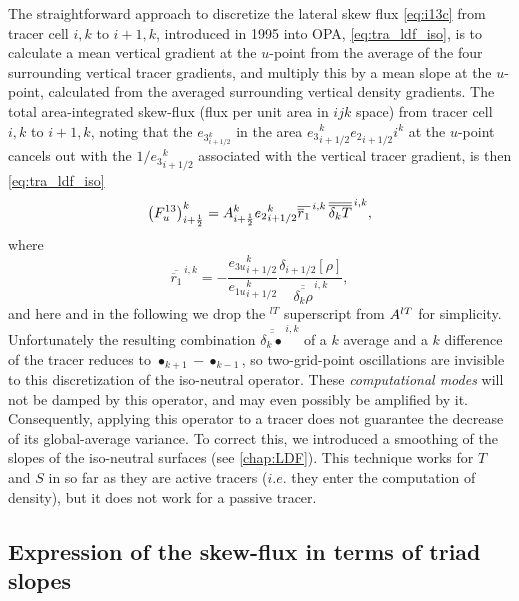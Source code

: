 \documentclass[../main/NEMO_manual]{subfiles}
\begin{document}
The straightforward approach to discretize the lateral skew flux
\autoref{eq:i13c} from tracer cell $i,k$ to $i+1,k$, introduced in 1995 into OPA,
\autoref{eq:tra_ldf_iso}, is to calculate a mean vertical gradient at the $u$-point from
the average of the four surrounding vertical tracer gradients, and multiply this by a mean slope at the $u$-point,
calculated from the averaged surrounding vertical density gradients.
The total area-integrated skew-flux (flux per unit area in $ijk$ space) from tracer cell $i,k$ to $i+1,k$,
noting that the $e_{{3}_{i+1/2}^k}$ in the area $e{_{3}}_{i+1/2}^k{e_{2}}_{i+1/2}i^k$ at the $u$-point cancels out with
the $1/{e_{3}}_{i+1/2}^k$ associated with the vertical tracer gradient, is then \autoref{eq:tra_ldf_iso}
\[
  \left(F_u^{13} \right)_{i+\scriptstyle\frac{1}{2}}^k = {A}_{i+\scriptstyle\frac{1}{2}}^k
  {e_{2}}_{i+1/2}^k \overline{\overline
    r_1} ^{\,i,k}\,\overline{\overline{\delta_k T}}^{\,i,k},
\]
where
\[
  \overline{\overline
    r_1} ^{\,i,k} = -\frac{{e_{3u}}_{i+1/2}^k}{{e_{1u}}_{i+1/2}^k}
  \frac{\delta_{i+1/2} [\rho]}{\overline{\overline{\delta_k \rho}}^{\,i,k}},
\]
and here and in the following we drop the $^{lT}$ superscript from ${A^{lT}}$ for simplicity.
Unfortunately the resulting combination $\overline{\overline{\delta_k\bullet}}^{\,i,k}$ of a $k$ average and
a $k$ difference of the tracer reduces to $\bullet_{k+1}-\bullet_{k-1}$,
so two-grid-point oscillations are invisible to this discretization of the iso-neutral operator.
These \emph{computational modes} will not be damped by this operator, and may even possibly be amplified by it.
Consequently, applying this operator to a tracer does not guarantee the decrease of its global-average variance.
To correct this, we introduced a smoothing of the slopes of the iso-neutral surfaces (see \autoref{chap:LDF}).
This technique works for $T$ and $S$ in so far as they are active tracers
($i.e.$ they enter the computation of density), but it does not work for a passive tracer.

\subsection{Expression of the skew-flux in terms of triad slopes}
\end{document}
